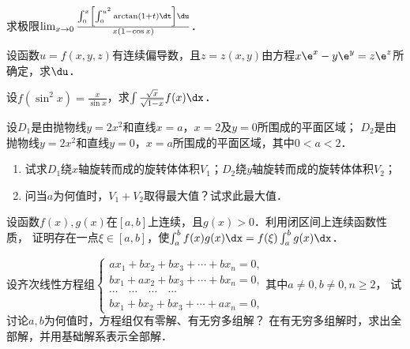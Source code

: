 \documentclass[plain,noanswer,medmath]{../../template/jnuexam}
\begin{document}

\begin{problem}
求极限$\lim_{x \to 0} \frac{\int_0^x \left[\int_0^{u^2} \arctan(1 + t)\dt \right]\du}{x(1 - \cos x)}$．
\end{problem}



\begin{problem}
设函数$u = f(x,y,z)$有连续偏导数，且$z = z(x,y)$由方程$x\e^x - y\e^y = z\e^z$所确定，求$\du$．
\end{problem}



\begin{problem}
设$f(\sin^2 x) = \frac{x}{\sin x}$，求$\int \frac{\sqrt{x}}{\sqrt{1 - x}} f(x)\dx$．
\end{problem}



\begin{problem}
设$D_1$是由抛物线$y = 2x^2$和直线$x = a$，$x = 2$及$y = 0$所围成的平面区域；
$D_2$是由抛物线$y = 2x^2$和直线$y = 0$，$x = a$所围成的平面区域，其中$0 < a < 2$．
\begin{enumerate}
\item 试求$D_1$绕$x$轴旋转而成的旋转体体积$V_1$；$D_2$绕$y$轴旋转而成的旋转体体积$V_2$；
\item 问当$a$为何值时，$V_1 + V_2$取得最大值？试求此最大值．
\end{enumerate}
\end{problem}






\begin{problem}
设函数$f(x),g(x)$在$[a,b]$上连续，且$g(x) > 0$．利用闭区间上连续函数性质，
证明存在一点$\xi \in[a,b]$，使$\int_a^b f(x)g(x)\dx = f(\xi) \int_a^b g(x)\dx$．
\end{problem}



\begin{problem}
设齐次线性方程组$\begin{cases}
  ax_1 + bx_2 + bx_3 + \cdots + bx_n = 0, \\
  bx_1 + ax_2 + bx_3 + \cdots + bx_n = 0, \\
   \cdots \quad \cdots \quad \cdots \quad \cdots \\
  bx_1 + bx_2 + bx_3 + \cdots + ax_n = 0,
\end{cases}$其中$a \ne 0,b \ne 0,n \ge 2$，
试讨论$a,b$为何值时，方程组仅有零解、有无穷多组解？
在有无穷多组解时，求出全部解，并用基础解系表示全部解．
\end{problem}
\end{document}
